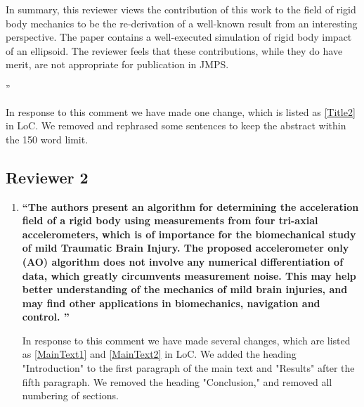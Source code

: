 \documentclass[11pt,letterpaper]{report}
\begin{document}
\begin{enumerate}[label=\textit{1.\arabic*},wide, labelwidth=!, labelindent=0pt]
{In summary, this reviewer views the contribution of this work to the field of rigid body mechanics to be the re-derivation of a well-known result from an interesting perspective. The paper contains a well-executed simulation of rigid body impact of an ellipsoid. The reviewer feels that these contributions, while they do have merit, are not appropriate for publication in JMPS.

''}

In response to this comment we have made one change, which is listed as \ref{Title2} in LoC. We removed and rephrased some sentences to keep the abstract within the 150 word limit.

\end{enumerate}

\subsection*{Reviewer 2}
\begin{enumerate}[label=\textit{2.\arabic*},wide, labelwidth=!, labelindent=0pt]

\item \label{e2c1}{\bf ``The authors present an algorithm for determining the acceleration field of a rigid body using measurements from four tri-axial accelerometers, which is of importance for the biomechanical study of mild Traumatic Brain Injury.  The proposed accelerometer only (AO) algorithm does not involve any numerical differentiation of data, which greatly circumvents measurement noise. This may help better  understanding of the mechanics of mild brain injuries, and may find other applications in biomechanics, navigation and control.
''}

In response to this comment we have made several changes, which are listed as \ref{MainText1} and \ref{MainText2} in LoC. We added the heading "Introduction" to the first paragraph of the main text and "Results" after the fifth paragraph. We removed the heading "Conclusion," and removed all numbering of sections.

\end{enumerate}



\newpage
\setcounter{page}{1}
\thispagestyle{fancy}
\phantom{x}
\vspace{4em}
\end{document}
